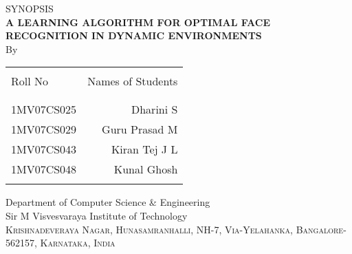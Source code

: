 
\begin{titlepage}
\begin{center}

\textup{\Large SYNOPSIS}\\[0.5cm]

\uppercase{\Large \textbf {A Learning Algorithm for Optimal Face Recognition in Dynamic Environments}}\\[3.0cm]

\vspace{1.0cm}
\normalsize By \\
\begin{table}[h]
\centering
\begin{tabular}{lr}\hline \\
Roll No & Names of Students \\ \\ \hline
\\
1MV07CS025 & Dharini S \\
1MV07CS029 & Guru Prasad M \\
1MV07CS043 & Kiran Tej J L \\
1MV07CS048 & Kunal Ghosh \\ \\ \hline 
\end{tabular}
\end{table}

\vfill

\normalsize

\Large{Department of Computer Science & Engineering}\\
\LARGE{Sir M Visvesvaraya Institute of Technology }\\
\normalsize
\textsc{Krishnadeveraya Nagar, Hunasamranhalli, NH-7,
Via-Yelahanka, Bangalore-562157, Karnataka, India}\\

\vspace{0.5cm}


\end{center}

\end{titlepage}
